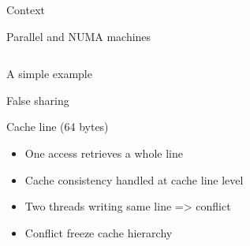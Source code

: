 \documentclass[xcolor={usenames,dvipsnames},hyperref={pdfusetitle}]{beamer}
\begin{document}
\begin{section}{Context}
\begin{frame}{Parallel and NUMA machines}
    \begin{columns}
        \begin{column}{.2\linewidth}
            \begin{block}{}
            \end{block}
        \end{column}
        \begin{column}{.8\linewidth}
            \centering
            \scalebox{.6}{
                
            }
        \end{column}
    \end{columns}
\end{frame}

\begin{frame}{A simple example}
    \centering
    \scalebox{.6}{
        
    }
\end{frame}

\begin{frame}{False sharing}
    \centering
    \scalebox{.8}{
        
    }
    \begin{block}{Cache line (64 bytes)}
        \begin{itemize}
            \item One access retrieves a whole line
            \item Cache consistency handled at cache line level
            \item Two threads writing same line => conflict
            \item Conflict freeze cache hierarchy
        \end{itemize}
    \end{block}
\end{frame}


\end{section}
\end{document}
